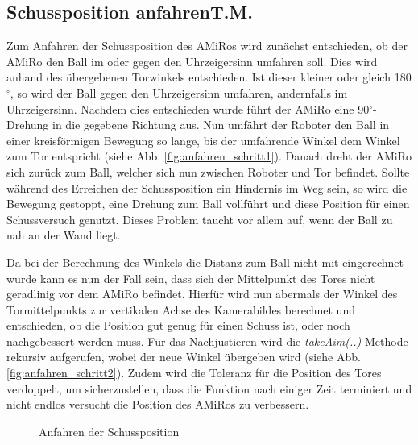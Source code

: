 \subsection[Schussposition anfahren]{Schussposition anfahren\hfill {\normalsize T.M.}} %

Zum Anfahren der Schussposition des AMiRos wird zunächst entschieden, ob der AMiRo den Ball im oder gegen den Uhrzeigersinn umfahren soll. Dies wird anhand des übergebenen Torwinkels entschieden. Ist dieser kleiner oder gleich 180$^\circ$, so wird der Ball gegen den Uhrzeigersinn umfahren, andernfalls im Uhrzeigersinn.
Nachdem dies entschieden wurde führt der AMiRo eine 90$^\circ$-Drehung in die gegebene Richtung aus. 
Nun umfährt der Roboter den Ball in einer kreisförmigen Bewegung so lange, bis der umfahrende Winkel dem Winkel zum Tor entspricht (siehe Abb. \ref{fig:anfahren_schritt1}). Danach dreht der AMiRo sich zurück zum Ball, welcher sich nun zwischen Roboter und Tor befindet.
Sollte während des Erreichen der Schussposition ein Hindernis im Weg sein, so wird die Bewegung gestoppt, eine Drehung zum Ball vollführt und diese Position für einen Schussversuch genutzt. Dieses Problem taucht vor allem auf, wenn der Ball zu nah an der Wand liegt.

Da bei der Berechnung des Winkels die Distanz zum Ball nicht mit eingerechnet wurde kann es nun der Fall sein, dass sich der Mittelpunkt des Tores nicht geradlinig vor dem AMiRo befindet. Hierfür wird nun abermals der Winkel des Tormittelpunkts zur vertikalen Achse des Kamerabildes berechnet und entschieden, ob die Position gut genug für einen Schuss ist, oder noch nachgebessert werden muss. 
Für das Nachjustieren wird die \textit{takeAim(..)}-Methode rekursiv aufgerufen, wobei der neue Winkel übergeben wird (siehe Abb. \ref{fig:anfahren_schritt2}). Zudem wird die Toleranz für die Position des Tores verdoppelt, um sicherzustellen, dass die Funktion nach einiger Zeit terminiert und nicht endlos versucht die Position des AMiRos zu verbessern.

\begin{figure} []
	\caption{Anfahren der Schussposition} 
	\label{fig:anfahren}
\end{figure} 


